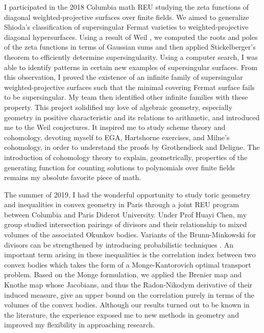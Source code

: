 \documentclass[11pt]{article}
\begin{document}
I participated in the 2018 Columbia math REU studying the zeta functions of diagonal weighted-projective surfaces over finite fields. We aimed to generalize Shioda’s classification of supersingular Fermat varieties  to weighted-projective diagonal hypersurfaces. Using a result of Weil , we computed the roots and poles of the zeta functions in terms of Gaussian sums and then applied Stickelberger's theorem to efficiently determine supersingularity. Using a computer search, I was able to identify patterns in certain new examples of supersingular surfaces. From this observation, I proved the existence of an infinite family of supersingular weighted-projective surfaces such that the minimal covering Fermat surface fails to be supersingular. My team then identified other infinite families with these property. This project solidified my love of algebraic geometry, especially geometry in positive characteristic and its relations to arithmetic, and introduced me to the Weil conjectures. It inspired me to study scheme theory and \etale cohomology, devoting myself to EGA, Hartshorne exercises, and Milne's \etale cohomology, in order to understand the proofs by Grothendieck and Deligne. The introduction of \etale cohomology theory to explain, geometrically, properties of the generating function for counting solutions to polynomials over finite fields remains my absolute favorite piece of math. 
\par
The summer of 2019, I had the wonderful opportunity to study toric geometry and inequalities in convex geometry in Paris through a joint REU program between Columbia and Paris Diderot University. Under Prof Huayi Chen, my group studied intersection pairings of divisors and their relationship to mixed volumes of the associated Okunkov bodies. Variants of the Brunn-Minkowski for divisors can be strengthened by introducing probabilistic techniques .
An important term arising in these inequalities is the correlation index between two convex bodies which takes the form of a Monge-Kantorovich optimal transport problem. Based on the Monge formulation, we applied the Brenier map and Knothe map whose Jacobians, and thus the Radon-Nikodym derivative of their induced measure, give an upper bound on the correlation purely in terms of the volumes of the convex bodies. Although our results turned out to be known in the literature, the experience exposed me to new methods in geometry and improved my flexibility in approaching research.
\par
\end{document}
